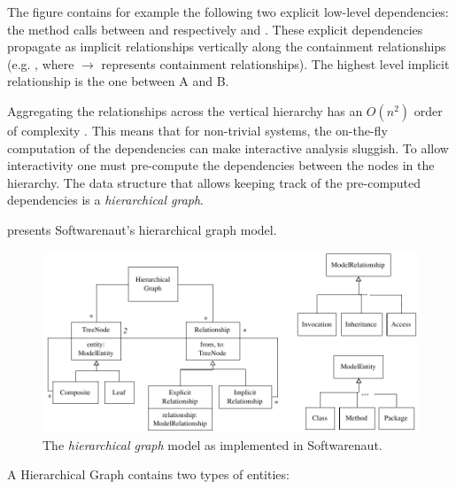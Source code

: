 \documentclass[preprint,12pt]{elsarticle}
\begin{document}
The figure contains for example the following two explicit low-level dependencies: the method calls between  and respectively  and . These explicit dependencies propagate as implicit relationships vertically along the containment relationships (e.g. , where $\rightarrow$ represents containment relationships). The highest level implicit relationship is the one between A and B. 

Aggregating the relationships across the vertical hierarchy has an $O(n^2)$ order of complexity \cite{buchsbaum-hierarchicalgraphs}. This means that for non-trivial systems, the on-the-fly computation of the dependencies can make interactive analysis sluggish. To allow interactivity one must pre-compute the dependencies between the nodes in the hierarchy. The data structure that allows keeping track of the pre-computed dependencies is a {\em hierarchical graph}. 

 presents Softwarenaut's hierarchical graph model.

\begin{figure}[ht]
\begin{center}
\includegraphics[width=\linewidth]{HigraphModel}
\caption{The {\em hierarchical graph} model as implemented in Softwarenaut.}
\end{center}
\end{figure}

A Hierarchical Graph contains two types of entities: 
\end{document}
